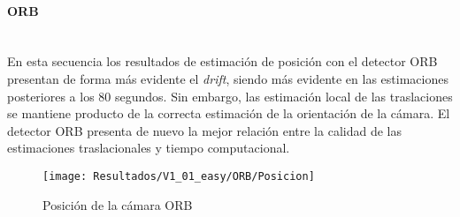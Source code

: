 \paragraph {ORB \\ \\}

En esta secuencia los resultados de estimación de posición con el detector ORB presentan de forma más evidente el \textit{drift}, siendo más evidente en las estimaciones posteriores a los 80 segundos. Sin embargo, las estimación local de las traslaciones se mantiene producto de la correcta estimación de la orientación de la cámara. El detector ORB presenta de nuevo la mejor relación entre la calidad de las estimaciones traslacionales y tiempo computacional.

\begin{figure}[H]
	\centering
	\texttt{[image: Resultados/V1\_01\_easy/ORB/Posicion]}
	\caption{Posición de la cámara ORB}
	\label{imagen:Resultados/V1_01_easy/ORB/Posicion}
\end{figure}



%
%
%
%
%
%
%
%

